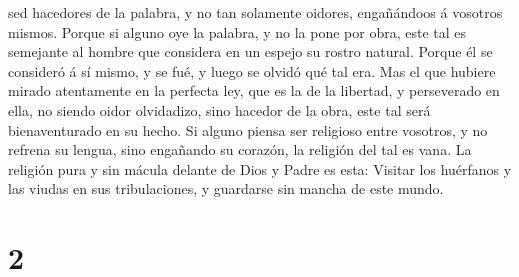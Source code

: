 sed hacedores de la palabra, y no tan solamente oidores, engañándoos á
vosotros mismos.  Porque si alguno oye la palabra, y no la
pone por obra, este tal es semejante al hombre que considera en un
espejo su rostro natural.  Porque él se consideró á sí
mismo, y se fué, y luego se olvidó qué tal era.  Mas el que
hubiere mirado atentamente en la perfecta ley, que es la de la libertad,
y perseverado en ella, no siendo oidor olvidadizo, sino hacedor de la
obra, este tal será bienaventurado en su hecho.  Si alguno
piensa ser religioso entre vosotros, y no refrena su lengua, sino
engañando su corazón, la religión del tal es vana.  La
religión pura y sin mácula delante de Dios y Padre es esta: Visitar los
huérfanos y las viudas en sus tribulaciones, y guardarse sin mancha de
este mundo.

\hypertarget{section-1}{%
\section{2}\label{section-1}}

